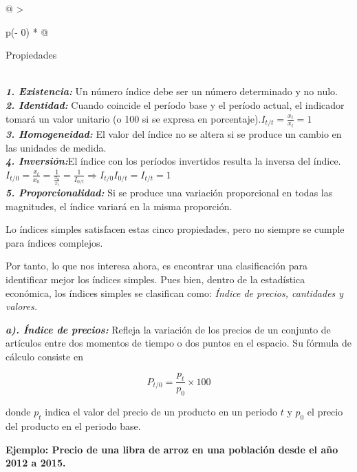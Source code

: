 \documentclass[
  11pt,
]{book}
\begin{document}
\begin{longtable}[]{@{}
  >{\raggedright\arraybackslash}p{(\columnwidth - 0\tabcolsep) * }@{}}
\toprule
\begin{minipage}[b]{\linewidth}\raggedright
Propiedades
\end{minipage} \\
\midrule
\endhead
\textbf{\emph{1. Existencia:}} Un número índice debe ser un número determinado y no nulo. \\
\textbf{\emph{2. Identidad:}} Cuando coincide el período base y el período actual, el indicador tomará un valor unitario (o 100 si se expresa en porcentaje).\(I_{t/t}=\frac{x_t}{x_t}=1\) \\
\textbf{\emph{3. Homogeneidad:}} El valor del índice no se altera si se produce un cambio en las unidades de medida. \\
\textbf{\emph{4. Inversión:}}El índice con los períodos invertidos resulta la inversa del índice.\(I_{t/0}=\frac{x_t}{x_0}=\frac{1}{\frac{x_0}{x_t}}=\frac{1}{I_{0/t}}\Longrightarrow I_{t/0}I_{0/t}=I_{t/t}=1\) \\
\textbf{\emph{5. Proporcionalidad:}} Si se produce una variación proporcional en todas las magnitudes, el índice variará en la misma proporción. \\
\bottomrule
\end{longtable}

Lo índices simples satisfacen estas cinco propiedades, pero no siempre se cumple para índices complejos.

Por tanto, lo que nos interesa ahora, es encontrar una clasificación para identificar mejor los índices simples. Pues bien, dentro de la estadística económica, los índices simples se clasifican como: \emph{Índice de precios, cantidades y valores.}

\textbf{\emph{a). Índice de precios:}} Refleja la variación de los precios de un conjunto de artículos entre dos momentos de tiempo o dos puntos en el espacio. Su fórmula de cálculo consiste en

\[\begin{equation}
P_{t/0}=\frac{p_{t}}{p_{0}}\times 100
\end{equation}\]

donde \(p_{t}\) indica el valor del precio de un producto en un periodo \(t\) y \(p_{0}\) el precio del producto en el periodo base.

\textbf{Ejemplo: Precio de una libra de arroz en una población desde el año 2012 a 2015.}
\end{document}
